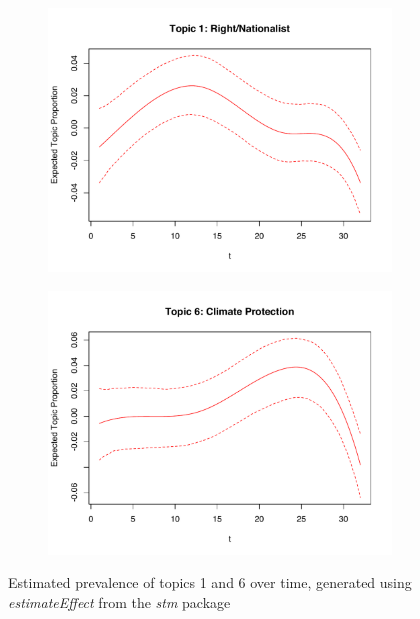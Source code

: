 \begin{figure}[h!]
  \centering
  \captionsetup{justification=centering,margin=2cm}
  \begin{subfigure}[b]{0.4\linewidth}
    \includegraphics[width=\linewidth]{../plots/5_1/estEffect_topic1.pdf}
  \end{subfigure}
  \begin{subfigure}[b]{0.4\linewidth}
    \includegraphics[width=\linewidth]{../plots/5_1/estEffect_topic6.pdf}
  \end{subfigure}
  \caption{Estimated prevalence of topics 1 and 6 over time, generated using \textit{estimateEffect} from the \textit{stm} package}
  \label{fig:estEffect_topic16}
\end{figure}

